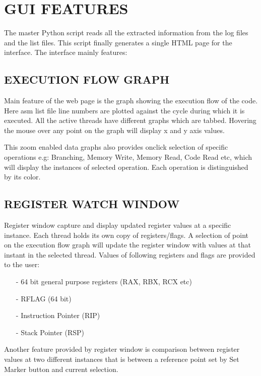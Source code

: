 \chapter{GUI FEATURES}
\label{chap:GUI_features.tex}

The master Python script reads all the extracted information from the log files and the list files. This script finally generates a single HTML page for the interface. The interface mainly features:


\section {EXECUTION FLOW GRAPH}

Main feature of the web page is the graph showing the execution flow of the code. Here asm list file line numbers are plotted against the cycle during which it is executed. All the active threads have different graphs which are tabbed. Hovering the mouse over any point on the graph will display x and y axis values. 
 
This zoom enabled data graphs also provides onclick selection of specific operations e.g: Branching, Memory Write, Memory Read, Code Read etc, which will display the instances of selected operation. Each operation is distinguished by its color.   


\section {REGISTER WATCH WINDOW}

Register window capture and display updated register values at a specific instance. Each thread holds its own copy of registers/flags. A selection of point on the execution flow graph will update the register window with values at that instant in the selected thread. Values of following registers and flags are provided to the user:

\begin{itemize}
	\item[-] 64 bit general purpose registers (RAX, RBX, RCX etc)
	\item[-] RFLAG (64 bit)
	\item[-] Instruction Pointer (RIP)
	\item[-] Stack Pointer (RSP)
\end{itemize}

Another feature provided by register window is comparison between register values at two different instances that is between a reference point set by Set Marker button and current selection. 


